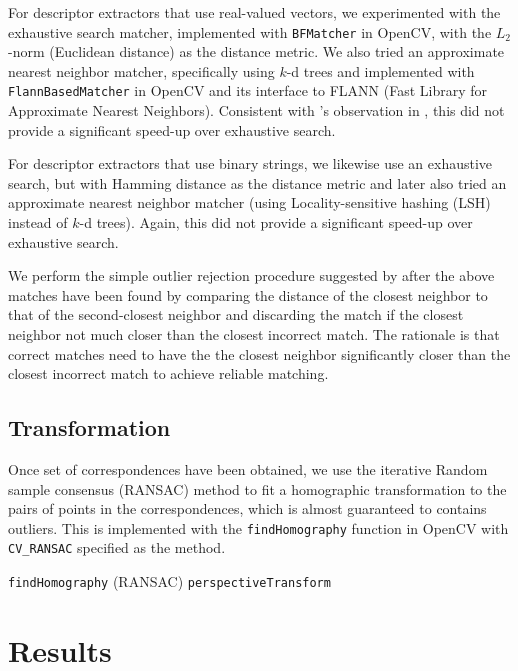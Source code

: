 \documentclass[11pt]{article} %
\theoremstyle{plain}
\theoremstyle{definition}
\theoremstyle{remark}
\numberwithin{equation}{section} %
\numberwithin{figure}{section} %
\numberwithin{table}{section} %
\begin{document}
For descriptor extractors that use real-valued vectors, we experimented with the exhaustive 
search matcher, implemented with \texttt{BFMatcher} in OpenCV, with the $L_2$-norm (Euclidean 
distance) as the distance metric. We also tried an approximate nearest neighbor matcher, 
specifically using $k$-d trees and implemented with \texttt{FlannBasedMatcher} in OpenCV 
and its interface to FLANN (Fast Library for Approximate Nearest Neighbors). Consistent with 
\citeauthor{Lowe2004}'s observation in \citep{Lowe2004}, this did not provide a significant 
speed-up over exhaustive search. 

For descriptor extractors that use binary strings, we likewise use an exhaustive search, but
with Hamming distance as the distance metric and later also tried an approximate nearest neighbor 
matcher (using Locality-sensitive hashing (LSH) instead of $k$-d trees). Again, this did not 
provide a significant speed-up over exhaustive search. 

We perform the simple outlier rejection procedure suggested by \citeauthor{Lowe2004} after 
the above matches have been found by comparing the distance of the closest neighbor 
to that of the second-closest neighbor and discarding the match if the closest neighbor
not much closer than the closest incorrect match. The rationale is that correct matches need 
to have the the closest neighbor significantly closer than the closest incorrect match to 
achieve reliable matching.

\subsection{Transformation}

Once set of correspondences have been obtained, we use the iterative Random sample consensus 
(RANSAC) method to fit a homographic transformation to the pairs of points in the correspondences,
which is almost guaranteed to contains outliers. This is implemented with the \texttt{findHomography} 
function in OpenCV with \texttt{CV\_RANSAC} specified as the method.

\texttt{findHomography} (RANSAC)
\texttt{perspectiveTransform}

\section{Results} \label{sec:results}




\end{document}
